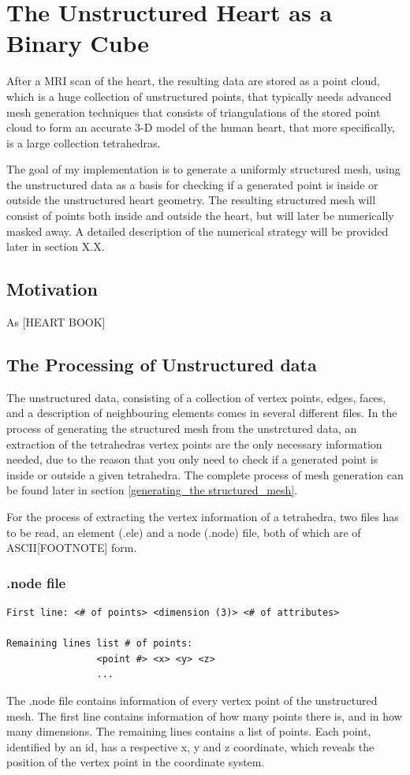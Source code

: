 \chapter{The Unstructured Heart as a Binary Cube} 
After a MRI scan of the heart, the resulting data are stored as a point cloud, which is a huge collection of unstructured points, that typically needs advanced mesh generation techniques that consists of triangulations of the stored point cloud to form an accurate 3-D model of the human heart, that more specifically, is a large collection tetrahedras. 

The goal of my implementation is to generate a uniformly structured mesh, using the unstructured data as a basis for checking if a generated point is inside or outside the unstructured heart geometry. The resulting structured mesh will consist of points both inside and outside the heart, but will later be numerically masked away. A detailed description of the numerical strategy will be provided later in section X.X.

\section{Motivation}
As [HEART BOOK]

\section{The Processing of Unstructured data}
The unstructured data, consisting of a collection of vertex points, edges, faces, and a description of neighbouring elements comes in several different files. In the process of generating the structured mesh from the unstrctured data, an extraction of the tetrahedras vertex points are the only necessary information needed, due to the reason that you only need to check if a generated point is inside or outside a given tetrahedra. The complete process of mesh generation can be found later in section \ref{generating_the structured_mesh}.

For the process of extracting the vertex information of a tetrahedra, two files has to be read, an element (.ele) and a node (.node) file, both of which are of ASCII[FOOTNOTE] form.

\subsection{.node file}
\begin{lstlisting}[caption=.node file]
First line:	<# of points> <dimension (3)> <# of attributes>

Remaining lines list # of points:
				<point #> <x> <y> <z> 
				...
\end{lstlisting}
The .node file contains information of every vertex point of the unstructured mesh. The first line contains information of how many points there is, and in how many dimensions. The remaining lines contains a list of points. Each point, identified by an id, has a respective x, y and z coordinate, which reveals the position of the vertex point in the coordinate system.


